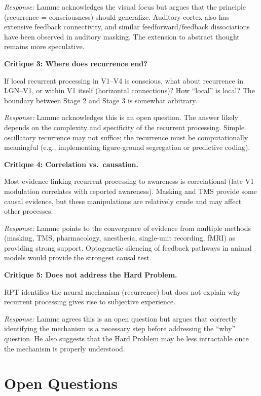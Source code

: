 \documentclass[11pt,a4paper]{report}
\begin{document}
\emph{Response:} Lamme acknowledges the visual focus but argues that the principle (recurrence = consciousness) should generalize. Auditory cortex also has extensive feedback connectivity, and similar feedforward/feedback dissociations have been observed in auditory masking. The extension to abstract thought remains more speculative.

\textbf{Critique 3: Where does recurrence end?}

If local recurrent processing in V1--V4 is conscious, what about recurrence in LGN--V1, or within V1 itself (horizontal connections)? How ``local'' is local? The boundary between Stage 2 and Stage 3 is somewhat arbitrary.

\emph{Response:} Lamme acknowledges this is an open question. The answer likely depends on the complexity and specificity of the recurrent processing. Simple oscillatory recurrence may not suffice; the recurrence must be computationally meaningful (e.g., implementing figure-ground segregation or predictive coding).

\textbf{Critique 4: Correlation vs.\ causation.}

Most evidence linking recurrent processing to awareness is correlational (late V1 modulation correlates with reported awareness). Masking and TMS provide some causal evidence, but these manipulations are relatively crude and may affect other processes.

\emph{Response:} Lamme points to the convergence of evidence from multiple methods (masking, TMS, pharmacology, anesthesia, single-unit recording, fMRI) as providing strong support. Optogenetic silencing of feedback pathways in animal models would provide the strongest causal test.

\textbf{Critique 5: Does not address the Hard Problem.}

RPT identifies the neural mechanism (recurrence) but does not explain why recurrent processing gives rise to subjective experience.

\emph{Response:} Lamme agrees this is an open question but argues that correctly identifying the mechanism is a necessary step before addressing the ``why'' question. He also suggests that the Hard Problem may be less intractable once the mechanism is properly understood.

\section{Open Questions}
\end{document}
